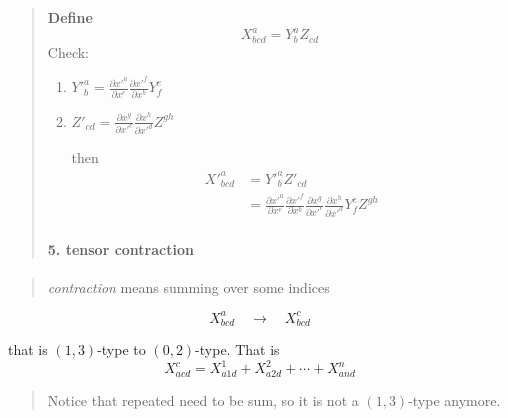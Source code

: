 \begin{quote}
	\textbf{Define}
\begin{equation}
X^{a}_{bcd} = Y^{a}_{b} Z_{cd}
\end{equation}
Check:
\begin{enumerate}
	\item $\displaystyle Y'^{a}_{b} = \frac{\partial x'^{a}}{\partial x^{e}}\frac{\partial x'^{f}}{\partial x^{b}}Y^{e}_{f}$
	\item $\displaystyle Z'_{cd} = \frac{\partial x^{g}}{\partial x'^{c}}\frac{\partial x^{h}}{\partial x'^{d}}Z^{gh}$

then
\begin{equation}
\begin{aligned}
X'^{a}_{bcd} &= Y'^{a}_{b} Z'_{cd}\\
&= \frac{\partial x'^{a}}{\partial x^{e}}\frac{\partial x'^{f}}{\partial x^{b}}\frac{\partial x^{g}}{\partial x'^{c}}\frac{\partial x^{h}}{\partial x'^{d}}Y^{e}_{f}Z^{gh}
\end{aligned}
\end{equation}

\end{enumerate}
\paragraph{5. tensor contraction} %

\end{quote}
\begin{quote}
	\textit{contraction} means summing over some indices
\end{quote}


\begin{equation}
X^{a}_{bcd} \quad\longrightarrow\quad X^{c}_{bcd}
\end{equation}

that is $(1,3)$-type to $(0,2)$-type. That is 
\begin{equation}
X^{c}_{acd} = X^{1}_{a1d} + X^{2}_{a2d} + \cdots + X^{n}_{and}
\end{equation}


\begin{quote}
	Notice that repeated need to be sum, so it is not a $(1,3)$-type anymore.
\end{quote}

